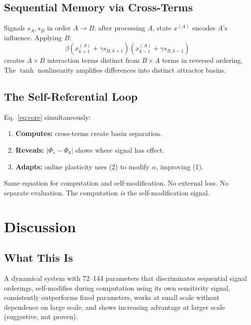 \documentclass[11pt,a4paper]{article}
\DeclareMathOperator{\tmark}{tanh}
\begin{document}
\subsection{Sequential Memory via Cross-Terms}

Signals $s_A, s_B$ in order $A \to B$: after processing $A$, state $x^{(A)}$ encodes $A$'s influence. Applying $B$:
$$\beta(x^{(A)}_{k{+}1} + \gamma s_{B,k{+}1})(x^{(A)}_{k{-}1} + \gamma s_{B,k{-}1})$$
creates $A \times B$ interaction terms distinct from $B \times A$ terms in reversed ordering. The $\tmark$ nonlinearity amplifies differences into distinct attractor basins.

\subsection{The Self-Referential Loop}

Eq.~\eqref{eq:core} simultaneously:
\begin{enumerate}[nosep]
\item \textbf{Computes:} cross-terms create basin separation.
\item \textbf{Reveals:} $|\Phi_s - \Phi_0|$ shows where signal has effect.
\item \textbf{Adapts:} online plasticity uses (2) to modify $\alpha$, improving (1).
\end{enumerate}

Same equation for computation and self-modification. No external loss. No separate evaluation. The computation \emph{is} the self-modification signal.

\section{Discussion}
\label{sec:discussion}

\subsection{What This Is}

A dynamical system with 72--144 parameters that discriminates sequential signal orderings, self-modifies during computation using its own sensitivity signal, consistently outperforms fixed parameters, works at small scale without dependence on large scale, and shows increasing advantage at larger scale (suggestive, not proven).
\end{document}
